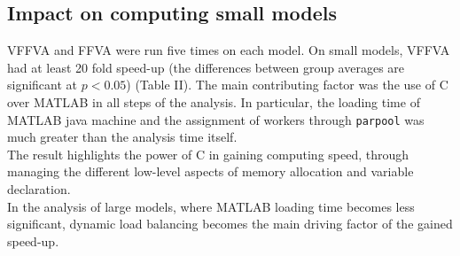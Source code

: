 \documentclass[letterpaper, 10 pt, conference]{ieeeconf}  %
\begin{document}
\subsection{Impact on computing small models}
VFFVA and FFVA were run five times on each model. On small models, VFFVA had at least 20 fold speed-up (the differences between group averages are significant at $p<0.05$) (Table II). The main contributing factor was the use of C over MATLAB in all steps of the analysis. In particular, the loading time of MATLAB java machine and the assignment of workers through \texttt{parpool} was much greater than the analysis time itself.\\
The result highlights the power of C in gaining computing speed, through managing the different low-level aspects of memory allocation and variable declaration.\\
In the analysis of large models, where MATLAB loading time becomes less significant, dynamic load balancing becomes the main driving factor of the gained speed-up.\\ 
\end{document}
